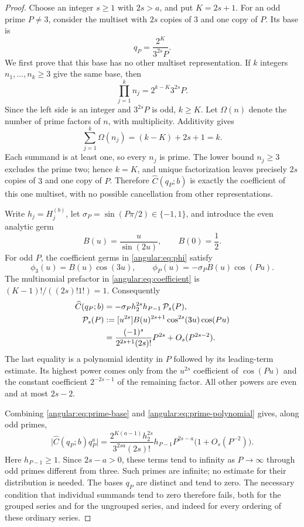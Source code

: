 \documentclass[11pt,a4paper]{article}
\theoremstyle{definition}
\theoremstyle{remark}
\numberwithin{equation}{section}
\begin{document}
\begin{proof}
Choose an integer $s\ge1$ with $2s>a$, and put $K=2s+1$.
For an odd prime $P\ne3$, consider the multiset with $2s$ copies
of $3$ and one copy of $P$. Its base is
\begin{equation}\label{angular:eq:prime-base}
 q_P=\frac{2^K}{3^{2s}P}.
\end{equation}
We first prove that this base has no other multiset representation.
If $k$ integers $n_1,\ldots,n_k\ge3$ give the same base, then
\[
 \prod_{j=1}^k n_j=2^{k-K}3^{2s}P.
\]
Since the left side is an integer and $3^{2s}P$ is odd, $k\ge K$.
Let $\Omega(n)$ denote the number of prime factors of $n$, with
multiplicity. Additivity gives
\[
 \sum_{j=1}^k\Omega(n_j)=(k-K)+2s+1=k.
\]
Each summand is at least one, so every $n_j$ is prime. The lower
bound $n_j\ge3$ excludes the prime two; hence $k=K$, and unique
factorization leaves precisely $2s$ copies of $3$ and one copy
of $P$. Therefore $\widehat C(q_P;b)$ is exactly the coefficient
of this one multiset, with no possible cancellation from other
representations.

Write $h_j=H_j^{(b)}$, let $\sigma_P=\sin(P\pi/2)\in\{-1,1\}$,
and introduce the even analytic germ
\[
 B(u)=\frac{u}{\sin(2u)},\qquad B(0)=\frac12.
\]
For odd $P$, the coefficient germs in
\eqref{angular:eq:phi} satisfy
\[
 \phi_3(u)=B(u)\cos(3u),\qquad
 \phi_P(u)=-\sigma_P B(u)\cos(Pu).
\]
The multinomial prefactor in \eqref{angular:eq:coefficient} is
$(K-1)!/((2s)!1!)=1$. Consequently
\begin{align}
 \widehat C(q_P;b)
 &=-\sigma_Ph_2^{2s}h_{P-1}\,\mathcal P_s(P),
 \label{angular:eq:prime-coefficient}\\
 \mathcal P_s(P)
 &:=[u^{2s}]B(u)^{2s+1}\cos^{2s}(3u)\cos(Pu)
 \notag\\
 &=\frac{(-1)^s}{2^{2s+1}(2s)!}P^{2s}
     +O_s(P^{2s-2}).
 \label{angular:eq:prime-polynomial}
\end{align}
The last equality is a polynomial identity in $P$ followed by its
leading-term estimate. Its highest power comes only from the
$u^{2s}$ coefficient of $\cos(Pu)$ and the constant coefficient
$2^{-2s-1}$ of the remaining factor. All other powers are even
and at most $2s-2$.

Combining \eqref{angular:eq:prime-base} and
\eqref{angular:eq:prime-polynomial} gives, along odd primes,
\[
 \bigl|\widehat C(q_P;b)q_P^a\bigr|
 =\frac{2^{K(a-1)}h_2^{2s}}{3^{2sa}(2s)!}
   h_{P-1}P^{2s-a}\bigl(1+O_s(P^{-2})\bigr).
\]
Here $h_{P-1}\ge1$. Since $2s-a>0$, these terms tend to infinity
as $P\to\infty$ through odd primes different from three. Such
primes are infinite; no estimate for their distribution is needed.
The bases $q_P$ are distinct and tend to zero. The necessary
condition that individual summands tend to zero therefore fails,
both for the grouped series and for the ungrouped series, and
indeed for every ordering of these ordinary series.
\end{proof}
\end{document}
